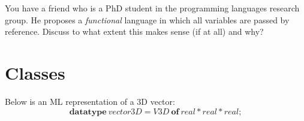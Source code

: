 \documentclass[10pt,a4paper,fleqn]{exam}
\begin{document}
\begin{questions}
\question You have a friend who is a PhD student in the programming languages research group. He proposes a \emph{functional} language in which all variables are passed by reference. Discuss to what extent this makes sense (if at all) and why?



\section{Classes}

\question Below is an ML representation of a 3D vector:
\begin{displaymath}
\mathbf{datatype}~\mathit{vector3D} = \mathit{V3D}~\mathbf{of}~\mathit{real} * \mathit{real} * \mathit{real};
\end{displaymath}
\end{questions}
\end{document}
